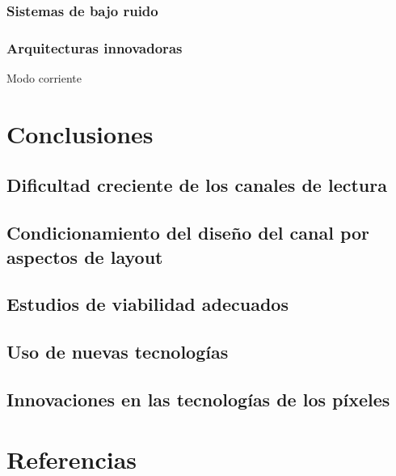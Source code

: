 \documentclass[12pt,a4paper,oneside,titlepage]{report}
\begin{document}
\subsection{Sistemas de bajo ruido}

\subsection{Arquitecturas innovadoras}
Modo corriente

\chapter{Conclusiones}

\section{Dificultad creciente de los canales de lectura}

\section{Condicionamiento del diseño del canal por aspectos de layout}

\section{Estudios de viabilidad adecuados}

\section{Uso de nuevas tecnologías}

\section{Innovaciones en las tecnologías de los píxeles}

\chapter{Referencias}
\end{document}
